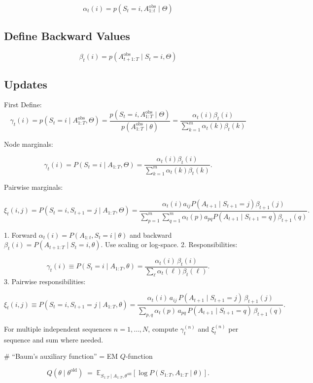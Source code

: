 \[
    \alpha_t(i) = p(S_t = i, A_{1:t}^{\text{obs}} \mid \Theta)
\]

\subsection{Define Backward Values}

\[
    \beta_t(i) = p( A_{t+1:T}^{\text{obs}} \mid S_t = i, \Theta)
\]


\subsection{Updates}

First Define:
\[
    \gamma _t(i) = p(S_t = i \mid A_{1:T}^{\text{obs}}, \Theta) = \frac {p(S_t=i, A_{1:T}^{\text{obs}} \mid \Theta )}{p(A_{1:T}^{\text{obs}} \mid \theta )} = \frac{\alpha_t(i) \beta_t(i)}{\sum\limits_{k=1}^m\alpha_t(k) \beta_t(k)}
\]

Node marginals:

\[
  \gamma_t(i) = P(S_t=i\mid A_{1:T},\Theta) = \frac{\alpha_t(i)\beta_t(i)}{\sum_{k=1}^m \alpha_t(k)\beta_t(k)}.
\]

Pairwise marginals:

\[
    \xi_t(i,j) = P(S_t=i, S_{t+1}=j \mid A_{1:T},\Theta) = \frac{\alpha_t(i) a_{ij} P(A_{t+1}\mid S_{t+1}=j) \beta_{t+1}(j)}{\sum\limits_{p=1}^m \sum\limits_{q=1}^m \alpha_t(p) a_{pq} P(A_{t+1}\mid S_{t+1}=q)\beta_{t+1}(q)}.

\]

\newpage

1. Forward $\alpha_t(i)=P(A_{1:t},S_t=i \mid \theta)$ and backward $\beta_t(i)=P(A_{t+1:T}\mid S_t=i,\theta)$. Use scaling or log-space.
2. Responsibilities:

   $$
   \gamma_t(i) \equiv P(S_t=i\mid A_{1:T},\theta)=\frac{\alpha_t(i)\,\beta_t(i)}{\sum_{\ell}\alpha_t(\ell)\beta_t(\ell)}.
   $$
3. Pairwise responsibilities:

   $$
   \xi_t(i,j) \equiv P(S_t=i,S_{t+1}=j\mid A_{1:T},\theta)=
   \frac{\alpha_t(i)\,a_{ij}\,P(A_{t+1}\mid S_{t+1}=j)\,\beta_{t+1}(j)}{\sum_{p,q}\alpha_t(p)\,a_{pq}\,P(A_{t+1}\mid S_{t+1}=q)\,\beta_{t+1}(q)}.
   $$

For multiple independent sequences $n=1,\dots,N$, compute $\gamma_t^{(n)}$ and $\xi_t^{(n)}$ per sequence and sum where needed.

# “Baum’s auxiliary function” = EM $Q$-function

$$
Q(\theta\mid\theta^{\text{old}}) \;=\; \mathbb{E}_{S_{1:T}\mid A_{1:T},\theta^{\text{old}}}\!\left[\log P(S_{1:T},A_{1:T}\mid \theta)\right].
$$

